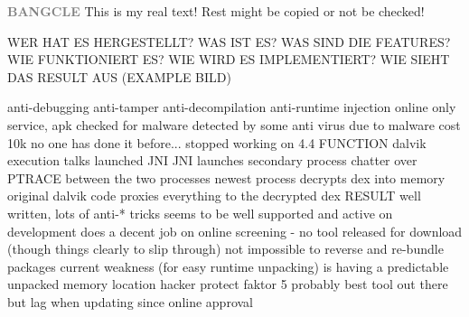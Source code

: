 \newline\newline\textbf{\textcolor{gray}{BANGCLE}}\newline
This is my real text! Rest might be copied or not be checked!



WER HAT ES HERGESTELLT? WAS IST ES? WAS SIND DIE FEATURES? WIE FUNKTIONIERT ES? WIE WIRD ES IMPLEMENTIERT? WIE SIEHT DAS RESULT AUS (EXAMPLE BILD)\newline

anti-debugging\newline
anti-tamper\newline
anti-decompilation\newline
anti-runtime injection\newline
online only service, apk checked for malware\newline
detected by some anti virus due to malware\newline
cost 10k\newline
no one has done it before...\newline
stopped working on 4.4\newline
FUNCTION\newline
dalvik execution talks launched JNI\newline
JNI launches secondary process\newline
chatter over PTRACE between the two processes\newline
newest process decrypts dex into memory\newline
original dalvik code proxies everything to the decrypted dex\newline
RESULT\newline
well written, lots of anti-* tricks\newline
seems to be well supported and active on development\newline
does a decent job on online screening - no tool released for download (though things clearly to slip through)\newline
not impossible to reverse and re-bundle packages\newline
current weakness (for easy runtime unpacking) is having a predictable unpacked memory location\newline
hacker protect faktor 5\newline
probably best tool out there but lag when updating since online approval\newline
